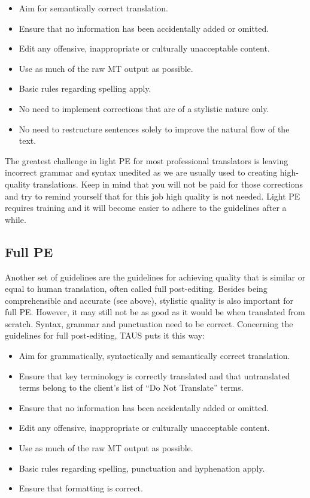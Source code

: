 \begin{itemize}
    \item Aim for semantically correct translation. 
    \item Ensure that no information has been accidentally added or omitted.
    \item Edit any offensive, inappropriate or culturally unacceptable content.
    \item Use as much of the raw MT output as possible.
    \item Basic rules regarding spelling apply.
    \item No need to implement corrections that are of a stylistic nature only.
    \item No need to restructure sentences solely to improve the natural flow of the text.
\end{itemize}

The greatest challenge in light PE for most professional translators is leaving incorrect grammar and syntax unedited as we are usually used to creating high-quality translations. Keep in mind that you will not be paid for those corrections and try to remind yourself that for this job high quality is not needed. Light PE requires training and it will become easier to adhere to the guidelines after a while.

\subsection{Full PE}\label{sec:4:1:2}

Another set of guidelines are the guidelines for achieving quality that is similar or equal to human translation, often called full post-editing.
Besides being comprehensible and accurate (see above), stylistic quality is also important for full PE. However, it may still not be as good as it would be when translated from scratch. Syntax, grammar and punctuation need to be correct.
Concerning the guidelines for full post-editing, TAUS puts it this way: 

\begin{itemize}
    \item Aim for grammatically, syntactically and semantically correct translation.
    \item Ensure that key terminology is correctly translated and that untranslated terms belong to the client’s list of “Do Not Translate” terms.
    \item Ensure that no information has been accidentally added or omitted.
    \item Edit any offensive, inappropriate or culturally unacceptable content.
    \item Use as much of the raw MT output as possible.
    \item Basic rules regarding spelling, punctuation and hyphenation apply.
    \item Ensure that formatting is correct.
\end{itemize}

